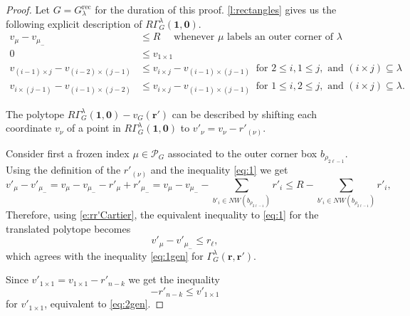 \documentclass{amsart}
\theoremstyle{definition}
\numberwithin{equation}{section}
\newcommand{\muminus}{\mu_{-}}
\newcommand{\rect}{\mathrm{rec}}
\begin{document}
\begin{proof} 
Let $G=G_{\lambda}^{\rect}$ for the duration of this proof. 
 \cref{l:rectangles} gives us the following explicit description of $R\Gamma^\lambda_G(\mathbf 1,\mathbf 0)$.
\begin{align}
		v_{\mu} - v_{\muminus} & \le R\quad \text{ whenever }\mu 
		\text{ labels an outer corner of }\lambda  \label{eq:1}\\
		0 & \leq v_{1 \times 1} \label{eq:2} \\
		v_{(i-1)\times j} - v_{(i-2)\times (j-1)} &\leq
v_{i \times j}  - v_{(i-1)\times (j-1)}
\ \text{ for }2 \leq i, 
		1\leq j, \text{ and } (i \times j) \subseteq \lambda \label{eq:3}\\	
v_{i\times (j-1)}-v_{(i-1)\times (j-2)} &\leq
v_{i\times j}  - v_{(i-1)\times (j-1)}
\ \text{ for } 1\leq i,
		2 \leq j, \text{ and } (i \times j) \subseteq \lambda. \label{eq:4}
	\end{align}
	
	The polytope $R\Gamma^\lambda_G(\mathbf 1,\mathbf 0)-v_G(\mathbf r')$ can be described by shifting each coordinate $v_\nu$ of a point in $R\Gamma^\lambda_G(\mathbf 1,\mathbf 0)$ to $v'_\nu=v_\nu- r'_{(\nu)}$. 

	Consider first a frozen index $\mu\in\mathcal P_G$ associated to the outer corner box $b_{\rho_{2\ell-1}}$. Using the definition of the $r'_{(\nu)}$ and the inequality \eqref{eq:1} we get 
\[
v'_\mu-v'_{\muminus}=v_\mu-v_{\muminus}-r'_\mu+r'_{\muminus}=v_\mu-v_{\muminus}-\sum_{b'_{i}\in NW(b_{\rho_{2\ell-1}})}r'_i\le R -\sum_{b'_{i}\in NW(b_{\rho_{2\ell-1}})}r'_i,
\]
Therefore, 
 using \eqref{e:rr'Cartier}, the equivalent inequality to \eqref{eq:1} for the translated polytope becomes
\begin{equation} v'_{\mu} - v'_{\muminus} \le r_\ell, \label{eq:1'}
 \end{equation}
 which agrees with the inequality \eqref{eq:1gen} for $\Gamma^\lambda_G(\mathbf r,\mathbf{r'})$.
  
Since $v'_{1\times 1}=v_{1\times 1}-r'_{n-k}$ we get the inequality
\begin{equation}-r'_{n-k}\le  v'_{1\times 1}  \label{eq:2'}
 \end{equation}
 for $v'_{1\times 1}$, equivalent to \eqref{eq:2gen}.
 

\end{proof}
\end{document}
